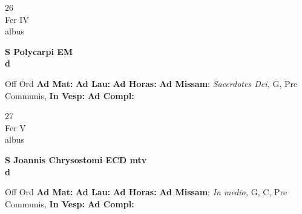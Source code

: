 \documentclass[10pt, openany]{book}
\begin{document}
        \begin{center}
            \begin{minipage}{3.5in}
                \vspace{2em}
                \begin{minipage}{0.5in}
                    {\Huge 26} \\
                    {\normalsize Fer IV} \\
                    {\normalsize albus}
                \end{minipage}
                \begin{minipage}{3.0in}
                    \textbf{ \large S Polycarpi EM \\
                    \textnormal{\normalsize d}} \\ 
                \end{minipage}
                \begin{justify}Off Ord
                    \textbf{Ad Mat: }
                    \textbf{Ad Lau: }
                    \textbf{Ad Horas: }\textbf{Ad Missam}: \textit{Sacerdotes Dei,} G, Pre Communis,  
                    \textbf{In Vesp: }
                    \textbf{Ad Compl: }
                \end{justify}
            \end{minipage}
        \end{center}
    
        \begin{center}
            \begin{minipage}{3.5in}
                \vspace{2em}
                \begin{minipage}{0.5in}
                    {\Huge 27} \\
                    {\normalsize Fer V} \\
                    {\normalsize albus}
                \end{minipage}
                \begin{minipage}{3.0in}
                    \textbf{ \large S Joannis Chrysostomi ECD mtv \\
                    \textnormal{\normalsize d}} \\ 
                \end{minipage}
                \begin{justify}Off Ord
                    \textbf{Ad Mat: }
                    \textbf{Ad Lau: }
                    \textbf{Ad Horas: }\textbf{Ad Missam}: \textit{In medio,} G, C, Pre Communis,  
                    \textbf{In Vesp: }
                    \textbf{Ad Compl: }
                \end{justify}
            \end{minipage}
        \end{center}
    
\end{document}
